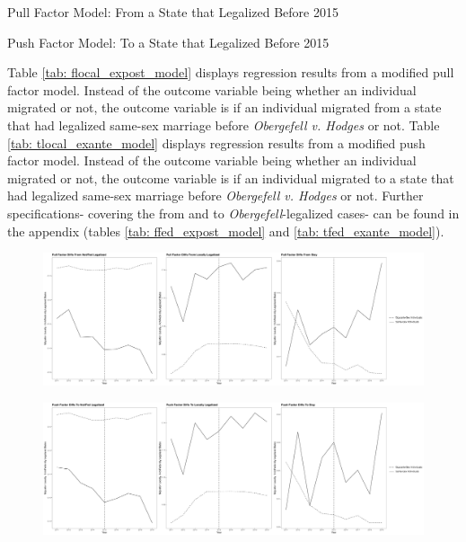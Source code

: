 \documentclass[12pt,letterpaper]{article}
\begin{document}
\begin{table}[htbp]
    \centering
    \caption{Pull Factor Model: From a State that Legalized Before 2015}
    \label{tab: flocal_expost_model}
    
\end{table}
\begin{table}[htbp] %
    \centering
    \caption{Push Factor Model: To a State that Legalized Before 2015}
    \label{tab: tlocal_exante_model}
    
\end{table}

Table \ref{tab: flocal_expost_model} displays regression results from a modified pull factor model. Instead of the outcome variable being whether an individual migrated or not, the outcome variable is if an individual migrated from a state that had legalized same-sex marriage before \textit{Obergefell v. Hodges} or not. Table \ref{tab: tlocal_exante_model} displays regression results from a modified push factor model. Instead of the outcome variable being whether an individual migrated or not, the outcome variable is if an individual migrated to a state that had legalized same-sex marriage before \textit{Obergefell v. Hodges} or not. Further specifications- covering the from and to \textit{Obergefell}-legalized cases- can be found in the appendix (tables \ref{tab: ffed_expost_model} and \ref{tab: tfed_exante_model}).

\begin{figure}[htbp]
    \centering
    \includegraphics[width=1\linewidth]{outputs/summary_stats/flows_post_diffs.png}
    \caption{}
    \label{fig: flows_post_diffs}
\end{figure}
\begin{figure}[htbp]
    \centering
    \includegraphics[width=1\linewidth]{outputs/summary_stats/flows_ante_diffs.png}
    \caption{}
    \label{fig: flows_ante_diffs}
\end{figure}
\end{document}
